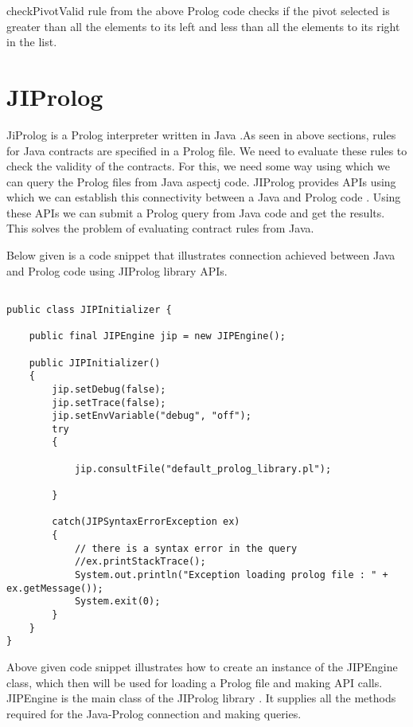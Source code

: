 checkPivotValid rule from the above Prolog code checks if the pivot selected is greater than all the elements to its left and less than all the elements to its right in the list.

\section{JIProlog}

JiProlog is a Prolog interpreter written in Java \cite{JIProlog}.As seen in above sections, rules for Java contracts are specified in a Prolog file. We need to evaluate these rules to check the validity of the contracts. For this, we need some way using which we can query the Prolog files from Java aspectj code.
JIProlog provides APIs using which we can establish this connectivity between a Java and Prolog code \cite{JIProlog}. Using these APIs we can submit a Prolog query from Java code and get the results. This solves the problem of evaluating contract rules from Java.

\begin{minipage}{\linewidth}
Below given is a code snippet that illustrates connection achieved between Java and Prolog code using JIProlog library APIs.

\lstset{language=Java,caption=Creating JIPEngine instance, captionpos=b, breaklines=true}       
\begin{lstlisting}[frame=single]

public class JIPInitializer {
	
	public final JIPEngine jip = new JIPEngine(); 
	
	public JIPInitializer()
	{
		jip.setDebug(false);
		jip.setTrace(false);
		jip.setEnvVariable("debug", "off");
		try
		{
		
			jip.consultFile("default_prolog_library.pl");
			
		}
		
		catch(JIPSyntaxErrorException ex)
		{
		    // there is a syntax error in the query
		    //ex.printStackTrace();
			System.out.println("Exception loading prolog file : " + ex.getMessage());
		    System.exit(0);
		}
	}
}
\end{lstlisting}
\end{minipage}

Above given code snippet illustrates how to create an instance of the JIPEngine class, which then will be used for loading a Prolog file and making API calls. JIPEngine is the main class of the JIProlog library \cite{JIProlog}. It supplies all the methods required for the Java-Prolog connection and making queries.

